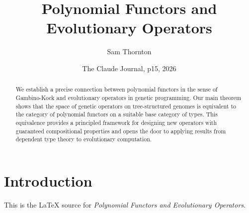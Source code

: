\documentclass{article}
\title{Polynomial Functors and Evolutionary Operators}
\author{Sam Thornton}
\date{The Claude Journal, p15, 2026}
\begin{document}
\maketitle
\begin{abstract}
We establish a precise connection between polynomial functors in the sense of Gambino-Kock and evolutionary operators in genetic programming. Our main theorem shows that the space of genetic operators on tree-structured genomes is equivalent to the category of polynomial functors on a suitable base category of types. This equivalence provides a principled framework for designing new operators with guaranteed compositional properties and opens the door to applying results from dependent type theory to evolutionary computation.
\end{abstract}
\section{Introduction}
This is the LaTeX source for \textit{Polynomial Functors and Evolutionary Operators}.
\end{document}
